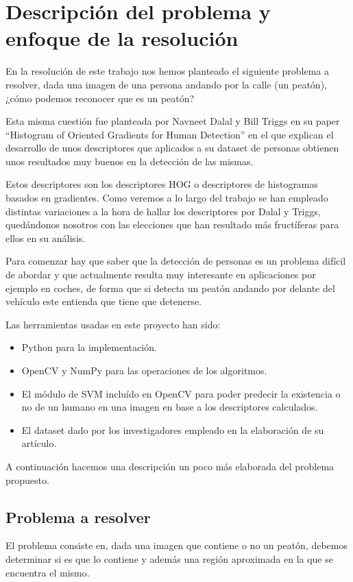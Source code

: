 \documentclass[a4paper,12pt]{article}
\begin{document}
\section{Descripción del problema y enfoque de la resolución}

En la resolución de este trabajo nos hemos planteado el siguiente problema a resolver, dada una imagen de una persona andando por la calle (un peatón), ¿cómo podemos reconocer que es un peatón?

Esta misma cuestión fue planteada por Navneet Dalal y Bill Triggs en su paper ``Histogram of Oriented Gradients for Human Detection'' en el que explican el desarrollo de unos descriptores que aplicados a su dataset de personas obtienen unos resultados muy buenos en la detección de las mismas. 

Estos descriptores son los descriptores HOG o descriptores de histogramas basados en gradientes. Como veremos a lo largo del trabajo se han empleado distintas variaciones a la hora de hallar los descriptores por Dalal y Triggs, quedándonos nosotros con las elecciones que han resultado más fructíferas para ellos en su análisis. 

Para comenzar hay que saber que la detección de personas es un problema difícil de abordar y que actualmente resulta muy interesante en aplicaciones por ejemplo en coches, de forma que si detecta un peatón andando por delante del vehículo este entienda que tiene que detenerse. 

Las herramientas usadas en este proyecto han sido:
\begin{itemize}
	\item Python para la implementación.
	\item OpenCV y NumPy para las operaciones de los algoritmos.
	\item El módulo de SVM incluído en OpenCV para poder predecir la existencia o no de un humano en una imagen en base a los descriptores calculados.
	\item El dataset dado por los investigadores empleado en la elaboración de su artículo.
\end{itemize}

A continuación hacemos una descripción un poco más elaborada del problema propuesto.

\subsection{Problema a resolver}

El problema consiste en, dada una imagen que contiene o no un peatón, debemos determinar si es que lo contiene y además una región aproximada en la que se encuentra el mismo. 
\end{document}

